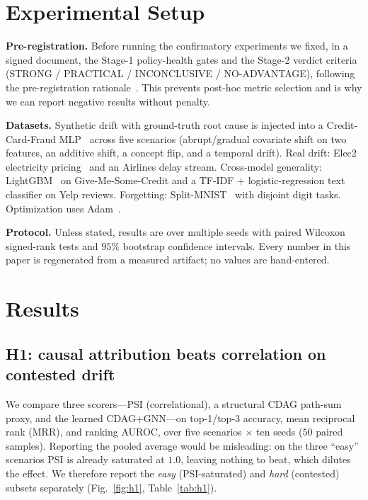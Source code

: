 \documentclass[conference]{IEEEtran}
\begin{document}
\section{Experimental Setup}\label{sec:setup}
\textbf{Pre-registration.} Before running the confirmatory experiments we
fixed, in a signed document, the Stage-1 policy-health gates and the
Stage-2 verdict criteria (STRONG / PRACTICAL / INCONCLUSIVE /
NO-ADVANTAGE), following the pre-registration
rationale~\cite{nosek2018preregistration,pineau2021reproducibility}. This
prevents post-hoc metric selection and is why we can report negative
results without penalty.

\textbf{Datasets.} Synthetic drift with ground-truth root cause is
injected into a Credit-Card-Fraud MLP~\cite{dalpozzolo2015calibrating}
across five scenarios (abrupt/gradual covariate shift on two features,
an additive shift, a concept flip, and a temporal drift). Real drift:
Elec2 electricity pricing~\cite{harries1999splice} and an Airlines
delay stream. Cross-model generality: LightGBM~\cite{ke2017lightgbm} on
Give-Me-Some-Credit and a TF-IDF + logistic-regression text classifier on
Yelp reviews. Forgetting: Split-MNIST~\cite{lecun1998mnist} with disjoint
digit tasks. Optimization uses Adam~\cite{kingma2015adam}.

\textbf{Protocol.} Unless stated, results are over multiple seeds with
paired Wilcoxon signed-rank tests and $95\%$ bootstrap confidence
intervals. Every number in this paper is regenerated from a measured
artifact; no values are hand-entered.

\section{Results}\label{sec:results}

\subsection{H1: causal attribution beats correlation on contested drift}\label{sec:h1}
We compare three scorers---PSI (correlational), a structural CDAG
path-sum proxy, and the learned CDAG+GNN---on top-1/top-3 accuracy, mean
reciprocal rank (MRR), and ranking AUROC, over five scenarios $\times$ ten
seeds ($50$ paired samples). Reporting the pooled average would be
misleading: on the three ``easy'' scenarios PSI is already saturated at
$1.0$, leaving nothing to beat, which dilutes the effect. We therefore
report the \emph{easy} (PSI-saturated) and \emph{hard} (contested) subsets
separately (Fig.~\ref{fig:h1}, Table~\ref{tab:h1}).
\end{document}
